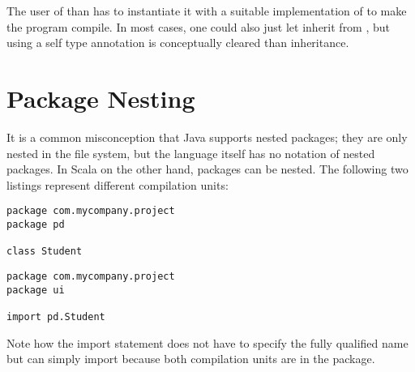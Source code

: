 The user of  than has to instantiate it with a suitable implementation of  to make the program compile. In most cases, one could also just let  inherit from , but using a self type annotation is conceptually cleared than inheritance.


\section{Package Nesting} \label{section:package-nesting}

It is a common misconception that Java supports nested packages; they are only nested in the file system, but the language itself has no notation of nested packages. In Scala on the other hand, packages can be nested. The following two listings represent different compilation units:

\begin{lstlisting}
package com.mycompany.project
package pd

class Student
\end{lstlisting}

\begin{lstlisting}
package com.mycompany.project
package ui

import pd.Student
\end{lstlisting}

Note how the import statement does not have to specify the fully qualified name but can simply import  because both compilation units are in the  package.

